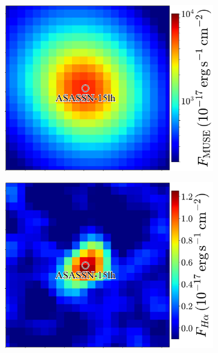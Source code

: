 \documentclass[traditabstract]{aa}
\begin{document}
\begin{figure}
\begin{subfigure}{.2425\textwidth}
  \includegraphics[width=1.0\linewidth]{fig/MUSE_ASASSN-15lh_flux.pdf}
\end{subfigure}
\begin{subfigure}{.2425\textwidth}
  \includegraphics[width=1.0\linewidth]{fig/MUSE_ASASSN-15lh_Ha.pdf}
\end{subfigure}
\begin{subfigure}{.2425\textwidth}

\end{subfigure}
\end{figure}
\end{document}
